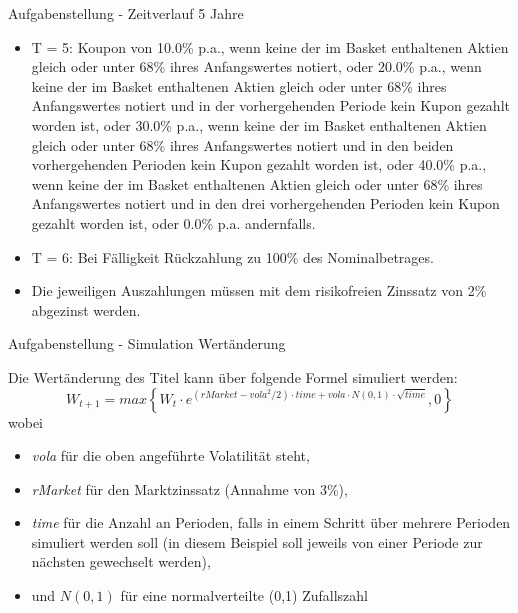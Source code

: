 \begin{frame}{Aufgabenstellung - Zeitverlauf 5 Jahre}
\begin{itemize}
	\item T = 5: Koupon von 10.0\% p.a., wenn keine der im Basket enthaltenen Aktien gleich
oder unter 68\% ihres Anfangswertes notiert, oder 20.0\% p.a., wenn keine der im
Basket enthaltenen Aktien gleich oder unter 68\% ihres Anfangswertes notiert und
in der vorhergehenden Periode kein Kupon gezahlt worden ist, oder 30.0\% p.a., wenn
keine der im Basket enthaltenen Aktien gleich oder unter 68\% ihres Anfangswertes
notiert und in den beiden vorhergehenden Perioden kein Kupon gezahlt worden ist,
oder 40.0\% p.a., wenn keine der im Basket enthaltenen Aktien gleich oder unter 68\%
ihres Anfangswertes notiert und in den drei vorhergehenden Perioden kein Kupon
gezahlt worden ist, oder 0.0\% p.a. andernfalls.
\end{itemize}

\begin{itemize}
	\item T = 6: Bei Fälligkeit Rückzahlung zu 100\% des Nominalbetrages.
	\item Die jeweiligen Auszahlungen müssen mit dem risikofreien Zinssatz von 2\% abgezinst werden.
\end{itemize}
\end{frame}

\begin{frame}{Aufgabenstellung - Simulation Wertänderung}

Die Wertänderung des Titel kann über folgende Formel simuliert werden:
\begin{equation*}
	W_{t+1} = max\left \{ W_t \cdot e^{(rMarket - vola^2/2) \cdot time + vola \cdot N(0,1) \cdot \sqrt{time}} , 0\right \}
\end{equation*}
wobei
\begin{itemize}
	\item \textit{vola} für die oben angeführte Volatilität steht,
	\item \textit{rMarket} für den Marktzinssatz (Annahme von 3\%),
	\item \textit{time} für die Anzahl an Perioden, falls in einem Schritt über mehrere Perioden simuliert werden soll (in diesem Beispiel soll jeweils von einer Periode zur nächsten gewechselt werden),
	\item und $N(0,1)$ für eine normalverteilte (0,1) Zufallszahl
\end{itemize}
\end{frame}


